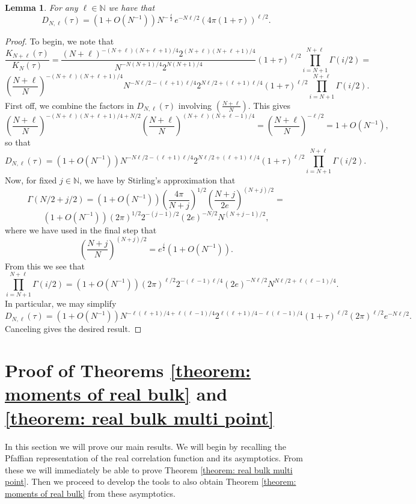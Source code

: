 \documentclass[12pt]{article}
\newcommand{\N}{\mathbb{N}}
\newtheorem{lem}[info]{Lemma}
\numberwithin{info}{section}
\numberwithin{equation}{section}
\renewcommand{\[}{\begin{equation}}
\renewcommand{\]}{\end{equation}}
\newcommand{\<}{\langle}
\renewcommand{\>}{\rangle}
\begin{document}
	\begin{lem}
		\label{lem:limit for D}
		For any $\ell\in \N$ we have that
		\[D_{N,\ell}(\tau)=\left(1+O(N^{-1})\right)N^{-\frac{\ell}{2}}e^{-N\ell/2}\left(4\pi (1+\tau)\right)^{\ell/2}.\]
	\end{lem}
	\begin{proof}
		To begin, we note that
		\[\frac{K_{N+\ell}(\tau)}{K_{N}(\tau)}=\frac{(N+\ell)^{-(N+\ell)(N+\ell+1)/4}2^{(N+\ell)(N+\ell+1)/4}}{N^{-N(N+1)/4}2^{N(N+1)/4}}(1+\tau)^{\ell/2}\prod_{i=N+1}^{N+\ell}\Gamma(i/2)=\]
		\[\left(\frac{N+\ell}{N}\right)^{-(N+\ell)(N+\ell+1)/4}N^{-N\ell/2-(\ell+1)\ell/4}2^{N\ell/2+(\ell+1)\ell/4}(1+\tau)^{\ell/2}\prod_{i=N+1}^{N+\ell}\Gamma(i/2).\]
		First off, we combine the factors in $D_{N,\ell}(\tau)$ involving $(\frac{N+\ell}{N})$. This gives \[\left(\frac{N+\ell}{N}\right)^{-(N+\ell)(N+\ell+1)/4+N/2}\left(\frac{N+\ell}{N}\right)^{(N+\ell)(N+\ell-1)/4}=\left(\frac{N+\ell}{N}\right)^{-\ell/2}=1+O(N^{-1}),\]
		so that
		\[D_{N,\ell}(\tau)=\left(1+O\left(N^{-1}\right)\right)N^{-N\ell/2-(\ell+1)\ell/4}2^{N\ell/2+(\ell+1)\ell/4}(1+\tau)^{\ell/2}\prod_{i=N+1}^{N+\ell}\Gamma(i/2).\]
		Now, for fixed $j\in \N$, we have by Stirling's approximation that
		\[\Gamma(N/2+j/2)=(1+O(N^{-1}))\left(\frac{4\pi}{N+j}\right)^{1/2}\left(\frac{N+j}{2e}\right)^{(N+j)/2}=\]
		\[\left(1+O(N^{-1})\right)(2\pi)^{1/2}2^{-(j-1)/2}\left(2e\right)^{-N/2}N^{(N+j-1)/2},\]
		where we have used in the final step that
		\[\left(\frac{N+j}{N}\right)^{(N+j)/2}=e^{\frac{j}{2}}(1+O(N^{-1})).\]
		From this we see that
		\[\prod_{i=N+1}^{N+\ell}\Gamma(i/2)=\left(1+O(N^{-1})\right)(2\pi)^{\ell/2}2^{-(\ell-1)\ell/4}(2e)^{-N\ell/2}N^{N\ell/2+\ell(\ell-1)/4}.\]
		In particular, we may simplify
		\[D_{N,\ell}(\tau)=\left(1+O(N^{-1})\right)N^{-\ell(\ell+1)/4+\ell(\ell-1)/4}2^{\ell(\ell+1)/4-\ell(\ell-1)/4}(1+\tau)^{\ell/2}(2\pi)^{\ell/2}e^{-N\ell/2}.\]
		Canceling gives the desired result.
	\end{proof}
	
	\section{Proof of Theorems \ref{theorem: moments of real bulk} and \ref{theorem: real bulk multi point} \label{section:proof of main theorem}}
	
	In this section we will prove our main results. We will begin by recalling the Pfaffian representation of the real correlation function and its asymptotics. From these we will immediately be able to prove Theorem \ref{theorem: real bulk multi point}. Then we proceed to develop the tools to also obtain Theorem \ref{theorem: moments of real bulk} from these asymptotics.
	
\end{document}
